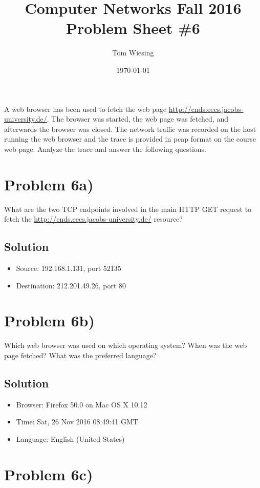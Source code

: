 \documentclass[a4paper,10pt]{article}
\title{Computer Networks Fall 2016\\Problem Sheet \#6}
\author{Tom Wiesing}
\date{\today}
\begin{document}
\maketitle

A web browser has been used to fetch the web page \url{http://cnds.eecs.jacobs-university.de/}. The browser was started, the web page was fetched, and afterwards the browser was closed. The network traffic was recorded on the host running the web browser and the trace is provided in pcap format on the course web page. Analyze the trace and answer the following questions.

\section{Problem 6a)}
What are the two TCP endpoints involved in the main HTTP GET request to fetch the \url{http://cnds.eecs.jacobs-university.de/} resource?

\subsection{Solution}

\begin{itemize}
  \item Source: 192.168.1.131, port 52135
  \item Destination: 212.201.49.26, port 80
\end{itemize}

\section{Problem 6b)}

Which web browser was used on which operating system? When was the web page fetched?
What was the preferred language?

\subsection{Solution}

\begin{itemize}
  \item Browser: Firefox 50.0 on Mac OS X 10.12
  \item Time: Sat, 26 Nov 2016 08:49:41 GMT
  \item Language: English (United States)
\end{itemize}

\section{Problem 6c)}
\end{document}
